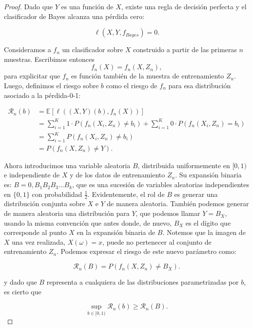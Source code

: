 \documentclass{report}
\begin{document}
\begin{proof}
Dado que \(Y\) es una función de \(X\), existe una regla de decisión perfecta y el clasificador de Bayes alcanza una pérdida cero:

\[
\ell(X,Y,f_{Bayes}) = 0.
\]

Consideramos a $f_n$ un clasificador sobre $X$ construido a partir de las primeras $n$ muestras. Escribimos entonces
\[
f_n(X) = f_n(X, Z_n),
\]
para explicitar que $f_n$ es función también de la muestra de entrenamiento $Z_n$. Luego, definimos el riesgo sobre \(b\)
como el riesgo de $f_n$ para esa distribución asociado a la pérdida-0-1:


\begin{equation*}
    \begin{aligned}
        \mathcal{R}_n(b) &= \mathbb{E}[\ell((X,Y)(b),f_n(X))]\\
        &= \sum_{i=1}^{K} 1 \cdot P(f_n(X_i, Z_n) \neq b_{i}) + \sum_{i=1}^{K} 0 \cdot P(f_n(X_i, Z_n) = b_{i})\\
        &= \sum_{i=1}^{K} P(f_n(X_i, Z_n) \neq b_{i}) \\
        &= P(f_n(X, Z_n) \neq Y).
    \end{aligned}
\end{equation*}


Ahora introducimos una variable aleatoria \(B\), distribuida uniformemente en \([0,1)\) e independiente de \(X\) y
de los datos de entrenamiento \(Z_n\). Su expansión binaria es: \(B = 0,B_1B_2B_3\dots B_k\), que es una sucesión
de variables aleatorias independientes en \(\{0,1\}\) con probabilidad $\frac{1}{2}$. Evidentemente, el rol de $B$
es generar una distribución conjunta sobre $X$ e $Y$ de manera aleatoria. También podemos generar de manera aleatoria
una distribución para $Y$, que podemos llamar $Y=B_X$, usando la misma convención que antes donde, de nuevo,
$B_X$ es el dígito que corresponde al punto $X$ en la expansión binaria de $B$. Notemos que la imagen de $X$ una vez realizada, $X(\omega) = x$,
puede no pertenecer al conjunto de entrenamiento $Z_n$.
Podemos expresar el riesgo de este nuevo parámetro como:


\[
\mathcal{R}_n(B) = P(f_n(X, Z_n) \neq B_X).
\]

y dado que $B$ representa a cualquiera de las distribuciones parametrizadas por $b$, es cierto que

\begin{equation}
    \sup_{b\in[0,1)} \mathcal{R}_n(b) \geq \mathcal{R}_n(B). \label{eq:cota_parametro_b_distribuciones}
\end{equation}




\end{proof}
\end{document}
